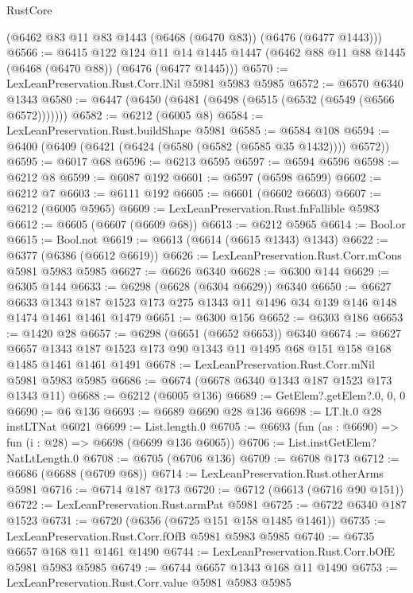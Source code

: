 \begin{lexlean}{RustCore}
\begin{coremodule}
    (@6462 @83 @11 @83 @1443 (@6468 (@6470 @83)) (@6476 (@6477 @1443)))
@6566 := @6415
    @122
    @124
    @11
    @14
    @1445
    @1447
    (@6462 @88 @11 @88 @1445 (@6468 (@6470 @88)) (@6476 (@6477 @1445)))
@6570 := LexLeanPreservation.Rust.Corr.lNil @5981 @5983 @5985
@6572 := @6570 @6340 @1343
@6580 := @6447 (@6450 (@6481 (@6498 (@6515 (@6532 (@6549 (@6566 @6572)))))))
@6582 := @6212 (@6005 @8)
@6584 := LexLeanPreservation.Rust.buildShape @5981
@6585 := @6584 @108
@6594 := @6400 (@6409 (@6421 (@6424 (@6580 (@6582 (@6585 @35 @1432)))) @6572))
@6595 := @6017 @68
@6596 := @6213 @6595
@6597 := @6594 @6596
@6598 := @6212 @8
@6599 := @6087 @192
@6601 := @6597 (@6598 @6599)
@6602 := @6212 @7
@6603 := @6111 @192
@6605 := @6601 (@6602 @6603)
@6607 := @6212 (@6005 @5965)
@6609 := LexLeanPreservation.Rust.fnFallible @5983
@6612 := @6605 (@6607 (@6609 @68))
@6613 := @6212 @5965
@6614 := Bool.or
@6615 := Bool.not
@6619 := @6613 (@6614 (@6615 @1343) @1343)
@6622 := @6377 (@6386 (@6612 @6619))
@6626 := LexLeanPreservation.Rust.Corr.mCons @5981 @5983 @5985
@6627 := @6626 @6340
@6628 := @6300 @144
@6629 := @6305 @144
@6633 := @6298 (@6628 (@6304 @6629)) @6340
@6650 := @6627
    @6633
    @1343
    @187
    @1523
    @173
    @275
    @1343
    @11
    @1496
    @34
    @139
    @146
    @148
    @1474
    @1461
    @1461
    @1479
@6651 := @6300 @156
@6652 := @6303 @186
@6653 := @1420 @28
@6657 := @6298 (@6651 (@6652 @6653)) @6340
@6674 := @6627
    @6657
    @1343
    @187
    @1523
    @173
    @90
    @1343
    @11
    @1495
    @68
    @151
    @158
    @168
    @1485
    @1461
    @1461
    @1491
@6678 := LexLeanPreservation.Rust.Corr.mNil @5981 @5983 @5985
@6686 := @6674 (@6678 @6340 @1343 @187 @1523 @173 @1343 @11)
@6688 := @6212 (@6005 @136)
@6689 := GetElem?.getElem?.{0, 0, 0}
@6690 := @6 @136
@6693 := @6689 @6690 @28 @136
@6698 := LT.lt.{0} @28 instLTNat @6021
@6699 := List.length.{0}
@6705 := @6693 (fun (as : @6690) => fun (i : @28) => @6698 (@6699 @136 @6065))
@6706 := List.instGetElem?NatLtLength.{0}
@6708 := @6705 (@6706 @136)
@6709 := @6708 @173
@6712 := @6686 (@6688 (@6709 @68))
@6714 := LexLeanPreservation.Rust.otherArms @5981
@6716 := @6714 @187 @173
@6720 := @6712 (@6613 (@6716 @90 @151))
@6722 := LexLeanPreservation.Rust.armPat @5981
@6725 := @6722 @6340 @187 @1523
@6731 := @6720 (@6356 (@6725 @151 @158 @1485 @1461))
@6735 := LexLeanPreservation.Rust.Corr.fOfB @5981 @5983 @5985
@6740 := @6735 @6657 @168 @11 @1461 @1490
@6744 := LexLeanPreservation.Rust.Corr.bOfE @5981 @5983 @5985
@6749 := @6744 @6657 @1343 @168 @11 @1490
@6753 := LexLeanPreservation.Rust.Corr.value @5981 @5983 @5985

\end{coremodule}
\end{lexlean}
